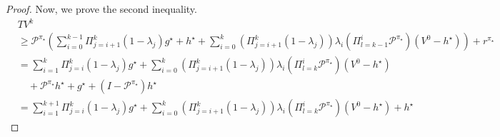 \documentclass{article} %
\newcommand{\cP}{\mathcal{P}}
\newcommand*{\para}[1]{\left({#1}\right)}
\begin{document}
\begin{proof}
Now, we prove the second inequality. 
                \begin{align*}
           &TV^{k} 
           \\& \ge \cP^{\pi_{\star}}\para{\sum_{i=0}^{k-1} \Pi^k_{j=i+1} (1-\lambda_j)g^{\star}+h^{\star}+ \sum_{i=0}^{k} (\Pi^k_{j=i+1} (1-\lambda_j)) \lambda_{i}\para{\Pi^{i}_{l=k-1}\cP^{\pi_{\star}}}(V^0-h^{\star})} +r^{\pi_{\star}}
           \\& = \sum_{i=1}^{k} \Pi^k_{j=i} (1-\lambda_j)g^{\star}+\sum_{i=0}^{k} (\Pi^k_{j=i+1} (1-\lambda_j)) \lambda_{i}\para{\Pi^{i}_{l=k}\cP^{\pi_{\star}}}(V^0-h^{\star})
           \\ &\quad +\cP^{\pi_{\star}}h^{\star}+g^{\star}+(I-\cP^{\pi_{\star}})h^{\star}
           \\& =\sum_{i=1}^{k+1} \Pi^k_{j=i} (1-\lambda_j)g^{\star} +\sum_{i=0}^{k} (\Pi^k_{j=i+1} (1-\lambda_j)) \lambda_{i}\para{\Pi^{i}_{l=k}\cP^{\pi_{\star}}}(V^0-h^{\star})+h^{\star}

\end{align*}
\end{proof}
\end{document}
